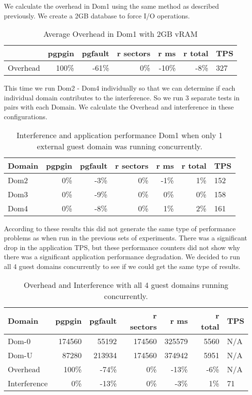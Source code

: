 We calculate the overhead in Dom1 using the same method as described previously. We create a 2GB database to force I/O operations.  

\begin{table}[h]
\begin{tabular}{ l r r r r r p{5cm} }
	         & pgpgin & pgfault & r sectors & r ms	& r total & TPS \\
	\hline
	Overhead & 100\%  & -61\%	 &      0\%	 & -10\% &    -8\% &  327 \\
\end{tabular}
\caption{Average Overhead in Dom1 with 2GB vRAM}
\end{table}

This time we run Dom2 - Dom4 individually so that we can determine if each individual domain contributes to the interference.  So we run 3 separate tests in pairs with each Domain.  We calculate the Overhead and interference in these configurations.

\begin{table}[h]
\begin{tabular}{ l r r r r r p{5cm} }
	Domain  & pgpgin & pgfault & r sectors & r ms	& r total & TPS \\
	\hline
	Dom2    &	0\%	 & -3\%    & 0\%    &-1\%    & 1\%    & 152  \\
    Dom3    &  	0\%	 & -9\%	   & 0\%	& 0\%	 & 0\%	  & 158  \\
    Dom4 	&   0\%  & -8\%    & 0\%	& 1\%	 & 2\%    & 161  \\
\end{tabular}
\caption{Interference and application performance Dom1 when only 1 external guest domain was running concurrently.}
\end{table}

According to these results this did not generate the same type of performance problems as when run in the previous sets of experiments.  There was a significant drop in the application TPS, but these performance counters did not show why there was a significant application performance degradation.  We decided to run all 4 guest domains concurrently to see if we could get the same type of results.

\begin{table}[h]
\begin{tabular}{ l r r r r r p{5cm} }
	Domain  & pgpgin & pgfault & r sectors & r ms	& r total & TPS \\
	\hline
	Dom-0	& 174560 &	55192 &	174560 &	325579 &	5560 & N/A \\
    Dom-U	& 87280	 & 213934 & 174560 &    374942 &    5951 & N/A \\
	Overhead& 100\%  &   -74\%&  0\%   &    -13\% &    -6\%  & N/A \\
    Interference & 0\% & -13\% & 0\%   &     -3\% &     1\%  & 71 \\
\end{tabular}
\caption{Overhead and Interference with all 4 guest domains running concurrently.}
\end{table}

